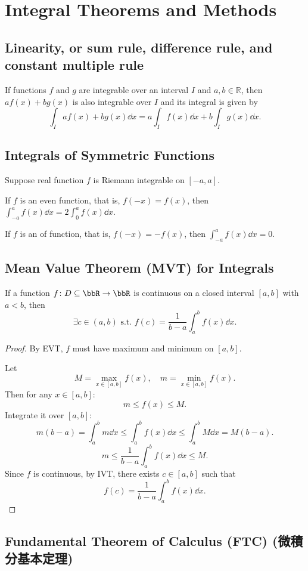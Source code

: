 \section{Integral Theorems and Methods}
\subsection{Linearity, or sum rule, difference rule, and constant multiple rule}
If functions $f$ and $g$ are integrable over an interval $I$ and $a,b\in\mathbb{R}$, then $af(x)+bg(x)$ is also integrable over $I$ and its integral is given by
\[\int_Iaf(x)+bg(x)\dd{x}=a\int_If(x)\dd{x}+b\int_Ig(x)\dd{x}.\]
\subsection{Integrals of Symmetric Functions}
Suppose real function $f$ is Riemann integrable on $[-a,a]$.
\bit
\item If $f$ is an even function, that is, $f(-x)=f(x)$, then $\int_{-a}^af(x)\dd{x}=2\int_0^af(x)\dd{x}$.
\item If $f$ is an of function, that is, $f(-x)=-f(x)$, then $\int_{-a}^af(x)\dd{x}=0$.
\eit
\subsection{Mean Value Theorem (MVT) for Integrals}
If a function $f\colon D\subseteq\bbR\to\bbR$ is continuous on a closed interval $[a,b]$ with $a<b$, then
\[\exists c\in (a, b)\text{\ s.t.\ }f(c)=\frac{1}{b-a}\int_a^bf(x)\dd{x}.\]
\begin{proof}
By EVT, $f$ must have maximum and minimum on $[a,b]$.

Let
\[M=\max_{x\in [a,b]}f(x),\quad m=\min_{x\in [a,b]}f(x).\]
Then for any $x\in[a,b]$:
\[m\leq f(x)\leq M.\]
Integrate it over $[a,b]$:
\[m(b-a)=\int_a^bm\dd{x}\leq\int_a^bf(x)\dd{x}\leq\int_a^bM\dd{x}=M(b-a).\]
\[m\leq\frac{1}{b-a}\int_a^bf(x)\dd{x}\leq M.\]
Since $f$ is continuous, by IVT, there exists $c\in[a,b]$ such that
\[f(c)=\frac{1}{b-a}\int_a^bf(x)\dd{x}.\]
\end{proof}
\subsection{Fundamental Theorem of Calculus (FTC) (微積分基本定理)}
